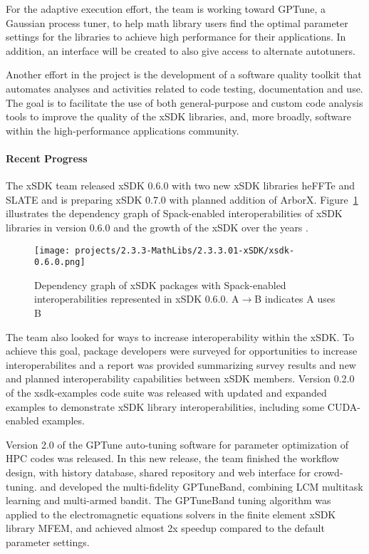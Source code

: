 For the adaptive execution effort, the team is working toward GPTune, a Gaussian process tuner, to help math library users find the optimal parameter settings for the libraries to achieve high performance for their applications. In addition, an interface will be created to also give access to alternate autotuners.

Another effort in the project is the development of a software quality toolkit that automates analyses and activities related to code testing, documentation and use. The goal is to facilitate the use of both general-purpose and custom code analysis tools to improve the quality of the xSDK libraries, and, more broadly, software within the high-performance applications community.

\paragraph{Recent Progress}

The xSDK team released xSDK 0.6.0 with two new xSDK libraries heFFTe and SLATE and is preparing xSDK 0.7.0 with planned addition of ArborX.
Figure~\ref{fig:xsdk-schematic} illustrates the dependency graph of Spack-enabled interoperabilities of xSDK libraries in version 0.6.0 and the growth of the xSDK over the years .
\begin{figure}[htb]
	\centering
	\texttt{[image: projects/2.3.3-MathLibs/2.3.3.01-xSDK/xsdk-0.6.0.png]}
	\caption{\label{fig:xsdk-schematic} Dependency graph of xSDK packages with Spack-enabled  interoperabilities represented in xSDK 0.6.0. A$\rightarrow$B indicates A uses B}
\end{figure}
The team also looked for ways to increase interoperability within the xSDK. To achieve this goal, package developers were surveyed for opportunities to increase interoperabilites and a report was provided summarizing survey results and new and planned interoperability capabilities between xSDK members. Version 0.2.0 of the xsdk-examples code suite was released with updated and expanded examples to demonstrate xSDK library interoperabilities, including some CUDA-enabled examples.

Version 2.0 of the GPTune auto-tuning software for parameter optimization of HPC codes \cite{gptune:homepage} was released. In this new release, the team finished the workflow design, with history database, shared repository and web interface for crowd-tuning. and developed the multi-fidelity GPTuneBand, combining LCM multitask learning and multi-armed bandit. The  GPTuneBand tuning algorithm was applied to the electromagnetic equations solvers in the finite element xSDK library MFEM, and achieved almost 2x speedup compared to the default parameter settings. 

